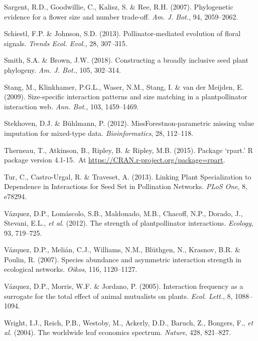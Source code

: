 \documentclass[
  12pt,
  a4paper,
]{article}
\newlength{\cslhangindent}
\newlength{\cslentryspacingunit} %
\newenvironment{CSLReferences}[2] %
 {%
  \setlength{\parindent}{0pt}
  \ifodd #1
  \let\oldpar\par
  \def\par{\hangindent=\cslhangindent\oldpar}
  \fi
  \setlength{\parskip}{#2\cslentryspacingunit}
 }%
 {}
\begin{document}
\begin{CSLReferences}{1}{0}
\leavevmode{}%
Sargent, R.D., Goodwillie, C., Kalisz, S. \& Ree, R.H. (2007). Phylogenetic evidence for a flower size and number trade-off. \emph{Am. J. Bot.}, 94, 2059--2062.

\leavevmode{}%
Schiestl, F.P. \& Johnson, S.D. (2013). Pollinator-mediated evolution of floral signals. \emph{Trends Ecol. Evol.}, 28, 307--315.

\leavevmode{}%
Smith, S.A. \& Brown, J.W. (2018). Constructing a broadly inclusive seed plant phylogeny. \emph{Am. J. Bot.}, 105, 302--314.

\leavevmode{}%
Stang, M., Klinkhamer, P.G.L., Waser, N.M., Stang, I. \& van der Meijden, E. (2009). Size-specific interaction patterns and size matching in a plant\textendash pollinator interaction web. \emph{Ann. Bot.}, 103, 1459--1469.

\leavevmode{}%
Stekhoven, D.J. \& Bühlmann, P. (2012). {MissForest}\textemdash non-parametric missing value imputation for mixed-type data. \emph{Bioinformatics}, 28, 112--118.

\leavevmode{}%
Therneau, T., Atkinson, B., Ripley, B. \& Ripley, M.B. (2015). Package {`rpart.'} R package version 4.1-15.~At \href{https://CRAN.R-project.org/package=rpart}{https://CRAN.r-project.org/package=rpart}.

\leavevmode{}%
Tur, C., Castro-Urgal, R. \& Traveset, A. (2013). Linking {Plant Specialization} to {Dependence} in {Interactions} for {Seed Set} in {Pollination Networks}. \emph{PLoS One}, 8, e78294.

\leavevmode{}%
Vázquez, D.P., Lomáscolo, S.B., Maldonado, M.B., Chacoff, N.P., Dorado, J., Stevani, E.L., \emph{et al.} (2012). The strength of plant\textendash pollinator interactions. \emph{Ecology}, 93, 719--725.

\leavevmode{}%
Vázquez, D.P., Melián, C.J., Williams, N.M., Blüthgen, N., Krasnov, B.R. \& Poulin, R. (2007). Species abundance and asymmetric interaction strength in ecological networks. \emph{Oikos}, 116, 1120--1127.

\leavevmode{}%
Vázquez, D.P., Morris, W.F. \& Jordano, P. (2005). Interaction frequency as a surrogate for the total effect of animal mutualists on plants. \emph{Ecol. Lett.}, 8, 1088--1094.

\leavevmode{}%
Wright, I.J., Reich, P.B., Westoby, M., Ackerly, D.D., Baruch, Z., Bongers, F., \emph{et al.} (2004). The worldwide leaf economics spectrum. \emph{Nature}, 428, 821--827.

\end{CSLReferences}
\end{document}
